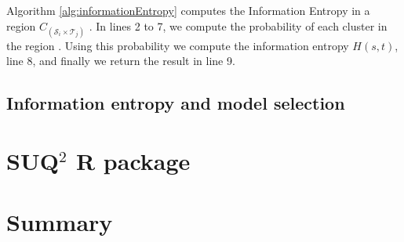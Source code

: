 Algorithm \ref{alg:informationEntropy}  computes the Information Entropy in a region $C_{(\mathcal{S}_{i} \times \mathcal{T}_{j})}$ . In lines 2 to 7, we compute the probability of each cluster in the region . Using this probability we compute the information entropy $H(s, t)$, line 8, and finally we return the result in line 9.

\subsection{Information entropy and model selection}

\section{SUQ$^2$ R package}

\section{Summary}\label{sec:approach_summary}